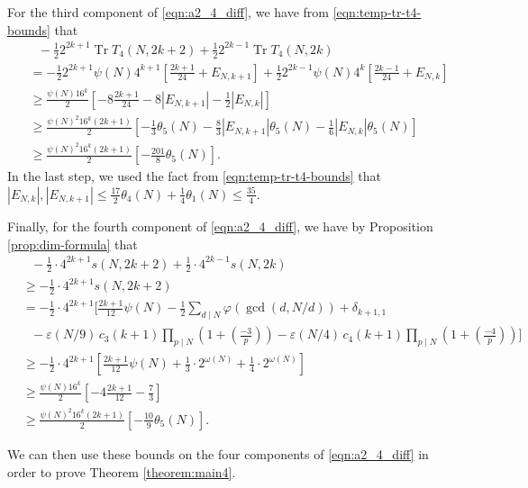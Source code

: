 \documentclass[11pt,letterpaper,reqno]{amsart}
\numberwithin{figure}{section}
\numberwithin{table}{section}
\theoremstyle{definition}
\theoremstyle{plain}
\newcommand{\lrabs}[1]{\left\lvert #1 \right\lvert}
\newcommand{\lrp}[1]{\left(#1\right)}
\newcommand{\lrb}[1]{\left[#1\right]}
\theoremstyle{definition}
\theoremstyle{definition}
\theoremstyle{remark}
\numberwithin{equation}{section}
\DeclareMathOperator{\Tr}{Tr}
\begin{document}
For the third component of \eqref{eqn:a2_4_diff}, we have from \eqref{eqn:temp-tr-t4-bounds} that
\begin{align}
    & \ \ \ - \frac12 2^{2k+1} \Tr T_4(N, 2k+2) + \frac12 2^{2k-1} \Tr T_4(N, 2k)\\
    &= - \frac12 2^{2k+1} \psi(N) 4^{k+1} \lrb{\frac{2k+1}{24} + E_{N,k+1}} + \frac12 2^{2k-1} \psi(N) 4^k \lrb{\frac{2k-1}{24} + E_{N,k}} \\
    &\geq \frac{ \psi(N) 16^k }{2} \lrb{  -8 \frac{2k+1}{24} - 8 \lrabs{E_{N,k+1}} -  \frac12 \lrabs{E_{N,k}} } \\
    &\geq \frac{ \psi(N)^2 16^k (2k+1) }{2} \lrb{  -\frac{1}{3} \theta_5(N) - \frac83 \lrabs{E_{N,k+1}}  \theta_5(N) -  \frac16 \lrabs{E_{N,k}}  \theta_5(N) } \\
    &\geq \frac{ \psi(N)^2 16^k (2k+1) }{2} \lrb{  -\frac{201}{8} \theta_5(N) }. \label{eqn:T4-comp3}
\end{align}
In the last step, we used the fact from \eqref{eqn:temp-tr-t4-bounds} that $\lrabs{E_{N,k}}, \lrabs{E_{N,k+1}} \leq \frac{17}{2} \theta_4(N) + \frac14 \theta_1(N) \leq \frac{35}{4}$.


Finally, for the fourth component of \eqref{eqn:a2_4_diff}, we have by Proposition \ref{prop:dim-formula} that
\begin{align}
    &\ \ \ -\frac12\cdot 4^{2k+1}s(N, 2k+2) + \frac12 \cdot 4^{2k-1}s(N, 2k) \\
    &\geq -\frac12\cdot 4^{2k+1} s(N, 2k+2) \\
    &= -\frac12\cdot  4^{2k+1} \Bigg[ 
    \frac{2k+1}{12} \psi(N) - \frac12  \sum_{d\mid N} \varphi(\gcd(d,N/d)) + \delta_{k+1,1} \\
    & \ \ \ - \varepsilon(N/9)\, c_3(k+1) \prod_{p \mid N} \lrp{1 + \lrp{\frac{-3}{p}} } 
        - \varepsilon(N/4)\, c_4(k+1) \prod_{p \mid N} \lrp{1 + \lrp{\frac{-4}{p}} }
    \Bigg] \\
    &\geq -\frac12\cdot 4^{2k+1} \lrb{ \frac{2k+1}{12} \psi(N) + \frac13 \cdot 2^{\omega(N)} + \frac14 \cdot 2^{\omega(N)} } \\
    &\geq \frac{\psi(N) 16^k}{2} \lrb{ -4 \frac{2k+1}{12} - \frac73  } \\
    &\geq \frac{\psi(N)^2 16^k (2k+1)}{2} \lrb{ -\frac{10}{9} \theta_5(N) }. \label{eqn:T4-comp4}
\end{align}

We can then use these bounds on the four components of \eqref{eqn:a2_4_diff} in order to prove Theorem \ref{theorem:main4}.
\end{document}
